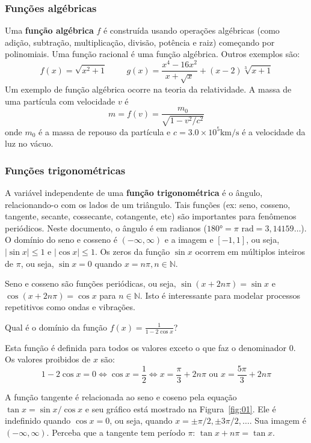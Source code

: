 \vspace{-0.3cm}
\subsubsection{Funções algébricas}

Uma \textbf{função algébrica} $f$ é construída usando operações algébricas (como adição, subtração, multiplicação, divisão, potência e raiz) começando por polinomiais. Uma função racional é uma função algébrica. Outros exemplos são:$$f(x)=\sqrt{x^2+1}\hspace{1cm} g(x)=\frac{x^4-16x^2}{x+\sqrt{x}}+(x-2)\sqrt[3]{x+1}$$
Um exemplo de função algébrica ocorre na teoria da relatividade. A massa de uma partícula com velocidade $v$ é $$m=f(v)=\frac{m_0}{\sqrt{1-v^2/c^2}}$$
onde $m_0$ é a massa de repouso da partícula e $c=3.0\times 10^5\si\km/\si\second$ é a velocidade da luz no vácuo.

\subsubsection{Funções trigonométricas}

A variável independente de uma \textbf{função trigonométrica} é o ângulo, relacionando-o com os lados de um triângulo. Tais funções (ex: seno, cosseno, tangente, secante, cossecante, cotangente, etc) são importantes para fenômenos periódicos. Neste documento, o ângulo é em radianos ($180\si\degree=\pi \text{ rad}=3,14159\dots$). O domínio do seno e cosseno é $(-\infty, \infty)$ e a imagem e $\left[-1,1\right]$, ou seja, $|\sin x| \leq 1$ e $|\cos x| \leq 1$. Os zeros da função $\sin x$ ocorrem em múltiplos inteiros de $\pi$, ou seja, $\sin x=0$ quando $x=n\pi, n\in \mathds{N}$.

Seno e cosseno são funções periódicas, ou seja, $\sin(x+2n\pi)=\sin x$ e $\cos(x+2n\pi)=\cos x$ para $n\in\mathds{N}$. Isto é interessante para modelar processos repetitivos como ondas e vibrações. 

 Qual é o domínio da função $\displaystyle f(x)=\frac{1}{1-2\cos x}$? 

\solution Esta função é definida para todos os valores exceto o que faz o denominador 0. Os valores proibidos de $x$ são: $$1-2\cos x = 0\Leftrightarrow \cos x=\frac{1}{2} \Leftrightarrow x = \frac{\pi}{3}+2n\pi \text{ ou } x=\frac{5\pi}{3}+ 2n\pi$$

\exampleEnd

A função tangente é relacionada ao seno e coseno pela equação $\tan x = \sin x/\cos x$ e seu gráfico está mostrado na Figura~\ref{fig:01}. Ele é indefinido quando $\cos x = 0$, ou seja, quando $x=\pm\pi/2,\pm 3\pi/2,\dots$. Sua imagem é $(-\infty, \infty)$. Perceba que a tangente tem período $\pi$: $\tan x+n\pi = \tan x$.

